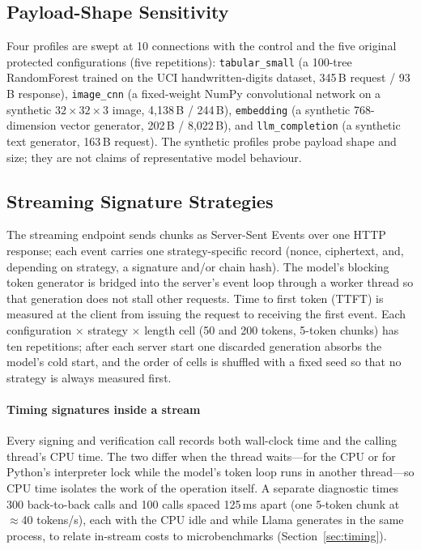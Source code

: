 \documentclass[conference]{IEEEtran}
\begin{document}
\subsection{Payload-Shape Sensitivity}
Four profiles are swept at 10 connections with the control and the five original protected
configurations (five repetitions):
\texttt{tabular\_small} (a 100-tree RandomForest trained on the UCI handwritten-digits dataset,
345\,B request / 93\,B response), \texttt{image\_cnn} (a fixed-weight NumPy convolutional network on a
synthetic $32\times32\times3$ image, 4,138\,B / 244\,B), \texttt{embedding} (a synthetic 768-dimension
vector generator, 202\,B / 8,022\,B), and \texttt{llm\_completion} (a synthetic text generator,
163\,B request). The synthetic profiles probe payload shape and size; they are not claims of
representative model behaviour.

\subsection{Streaming Signature Strategies}
The streaming endpoint sends chunks as Server-Sent Events over one HTTP response; each event carries
one strategy-specific record (nonce, ciphertext, and, depending on strategy, a signature and/or chain
hash). The model's blocking token generator is bridged into the server's event loop through a worker
thread so that generation does not stall other requests. Time to first token (TTFT) is measured at
the client from issuing the request to receiving the first event. Each configuration $\times$ strategy
$\times$ length cell (50 and 200 tokens, 5-token chunks) has ten repetitions; after each server start
one discarded generation absorbs the model's cold start, and the order of cells is shuffled with a
fixed seed so that no strategy is always measured first.

\paragraph*{Timing signatures inside a stream} Every signing and verification call records both
wall-clock time and the calling thread's CPU time. The two differ when the thread waits---for the CPU or
for Python's interpreter lock while the model's token loop runs in another thread---so CPU time isolates
the work of the operation itself. A separate diagnostic times 300 back-to-back calls and 100 calls spaced
125\,ms apart (one 5-token chunk at $\approx$40 tokens/s), each with the CPU idle and while Llama generates
in the same process, to relate in-stream costs to microbenchmarks (Section~\ref{sec:timing}).
\end{document}
